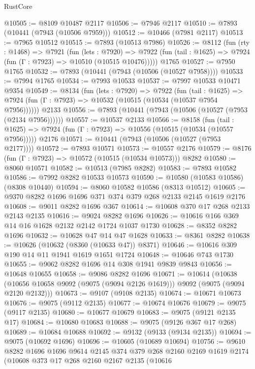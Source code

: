 \begin{lexlean}{RustCore}
\begin{coremodule}
@10505 := @8109 @10487 @2117
@10506 := @7946 @2117
@10510 := @7893 (@10441 (@7943 (@10506 @7959)))
@10512 := @10466 (@7981 @2117)
@10513 := @7965 @10512
@10515 := @7893 (@10513 @7986)
@10526 := @8112
    (fun (rty : @1468) =>
    @7921
      (fun (lets : @7920) =>
      @7922 (fun (tail : @1625) => @7924 (fun (Γ : @7923) => @10510 (@10515 @10476)))))
    @1765
@10527 := @7950 @1765
@10532 := @7893 (@10441 (@7943 (@10506 (@10527 @7958))))
@10533 := @7994 @1765
@10534 := @7993 @10533
@10537 := @7997 @10533 @10471 @9354
@10549 := @8134
    (fun (lets : @7920) =>
    @7922
      (fun (tail : @1625) =>
      @7924 (fun (Γ : @7923) => @10532 (@10515 (@10534 (@10537 @7954 @7956))))))
    @2133
@10556 := @7893 (@10441 (@7943 (@10506 (@10527 (@7953 (@2134 @7956))))))
@10557 := @10537 @2133
@10566 := @8158
    (fun (tail : @1625) => @7924 (fun (Γ : @7923) => @10556 (@10515 (@10534 (@10557 @7956)))))
    @2176
@10571 := @10441 (@7943 (@10506 (@10527 (@7953 @2177))))
@10572 := @7893 @10571
@10573 := @10557 @2176
@10579 := @8176 (fun (Γ : @7923) => @10572 (@10515 (@10534 @10573))) @8282
@10580 := @8060 @10571
@10582 := @10513 (@7985 @8282)
@10583 := @7893 @10582
@10586 := @7992 @8282 @10533 @10573
@10590 := @10580 (@10583 @10586) (@8308 @10440)
@10594 := @8060 @10582 @10586 (@8313 @10512)
@10605 := @9370 @8282 @1696 @1696 @371 @374 @379 @268 @2133 @2145 @1619 @2176
@10608 := @9011 @8282 @1696 @367
@10614 := @10608 @370 @17 @268 @2133 @2143 @2135
@10616 := @9024 @8282 @1696
@10626 := @10616 @166 @369 @14 @16 @1628 @2132 @2142 @1724 @1037 @1730
@10628 := @8352 @8282 @1696
@10632 := @10628 @47 @14 @47 @1628
@10633 := @8361 @8282
@10638 := @10626 (@10632 (@8360 (@10633 @47)) @8371)
@10646 := @10616 @309 @190 @14 @11 @1941 @1619 @1651 @1724
@10648 := @10646 @743 @1730
@10655 := @9062 @8282 @1696 @14 @308 @1941 @9839 @9843
@10656 := @10648 @10655
@10658 := @9086 @8282 @1696
@10671 := @10614
    (@10638 (@10656 @10658 @9092 (@9075 (@9094 @2126 @1619))) @9092 (@9075 (@9094 @2120 @2132)))
@10673 := @9107 (@9108 @2135)
@10674 := @10671 @10673
@10676 := @9075 (@9112 @2135)
@10677 := @10674 @10676
@10679 := @9075 (@9117 @2135)
@10680 := @10677 @10679
@10683 := @9075 (@9121 @2135 @17)
@10684 := @10680 @10683
@10688 := @9075 (@9126 @367 @17 @268)
@10689 := @10684 @10688
@10692 := @9132 (@9133 (@9134 @2135))
@10694 := @9075 (@10692 @1696)
@10696 := @10605 (@10689 @10694)
@10756 := @9610
    @8282
    @1696
    @1696
    @9614
    @2145
    @374
    @379
    @268
    @2160
    @2169
    @1619
    @2174
    (@10608
      @373
      @17
      @268
      @2160
      @2167
      @2135
      (@10616

\end{coremodule}
\end{lexlean}
